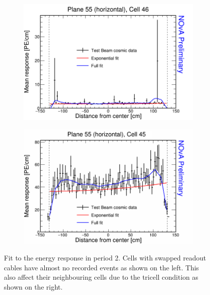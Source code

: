 \begin{figure}[h]
  \begin{subfigure}{0.495\textwidth}
    \includegraphics[width=\linewidth]{Plots/RelativeCalibrationResults/p2_055_046.png}
  \end{subfigure}
  \begin{subfigure}{0.495\textwidth}
    \includegraphics[width=\linewidth]{Plots/RelativeCalibrationResults/p2_055_045.png}
  \end{subfigure}
  \caption[Attenuation fits for cells with swapped cables in period 2 data]{Fit to the energy response in period 2. Cells with swapped readout cables have almost no recorded events as shown on the left. This also affect their neighbouring cells due to the tricell condition as shown on the right.}
  \label{fig:AttenfitResultsPerio2_SwappedCables}
\end{figure}

